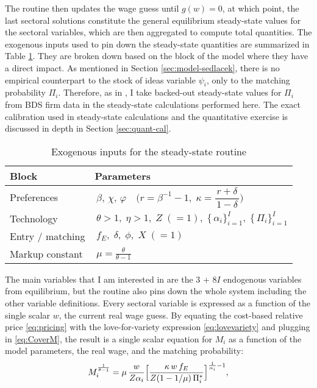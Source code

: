 \documentclass[a4paper,12pt]{article} %
\numberwithin{equation}{section} %
\numberwithin{figure}{section}
\numberwithin{table}{section}
\begin{document}
The routine then updates the wage guess until \(g(w)=0\), at which point, the last sectoral solutions constitute 
the general equilibrium steady-state values for the sectoral variables, which are then aggregated to compute total quantities.
The exogenous inputs used to pin down the steady-state quantities are summarized in Table \ref{tb:exoinputs}. They are broken
down based on the block of the model where they have a direct impact. As mentioned in Section \ref{sec:model-sedlacek}, 
there is no empirical counterpart to the stock of ideas variable $\psi_i$, only to the matching probability $\Pi_i$.
Therefore, as in \textcite{sedlavcek2017growth}, I take backed-out steady-state values for $\Pi_i$ from BDS firm data 
in the steady-state calculations performed here. The exact calibration used in steady-state calculations and the 
quantitative exercise is discussed in depth in Section \ref{sec:quant-cal}.

\begin{table}[H]
\centering
\begin{tabular}{@{}ll@{}}
\toprule
\textbf{Block} & \textbf{Parameters} \\ \midrule
Preferences & $\,\beta,\,\chi,\,\varphi\quad\bigl(r=\beta^{-1}-1,\;
                 \kappa=\dfrac{\,r+\delta\,}{1-\delta}\bigr)$ \\[4pt]
Technology  & $\,\theta>1,\;\eta>1,\;Z\;(=1),\;
               \{\,\alpha_i\}_{i=1}^{I},\; \{\,\Pi_i\}_{i=1}^{I}$ \\[4pt]
Entry / matching & $\,f_E,\;\delta,\;\phi,\;X\;(=1)$ \\[4pt]
Markup constant & $\,\displaystyle
                   \mu=\frac{\theta}{\theta-1}$ \\ \bottomrule
\end{tabular}
\caption{Exogenous inputs for the steady-state routine}
\label{tb:exoinputs}
\end{table}

 
The main variables that I am interested in are the 3 + 8$I$ endogenous variables from equilibrium, but the routine also
pins down the whole system including the other variable definitions. Every sectoral variable is expressed as a function of 
the single scalar $w$, the current real wage guess. By equating the cost-based relative price \eqref{eq:pricing} with the 
love-for-variety expression \eqref{eq:lovevariety} 
and plugging in \eqref{eq:CoverM}, the result is a single scalar equation for $M_i$ as a function of the model parameters,
the real wage, and the matching probability:
\begin{equation}
  M_i^{\frac1{\theta-1}}
=\mu\,\frac{w}{Z\alpha_i}
\Bigl[\frac{\kappa\,w\,f_E}{Z(1-1/\mu)\,\Pi_i^*}\Bigr]^{\frac1{\alpha_i}-1}, \label{Mscalar}
\end{equation}
\end{document}
